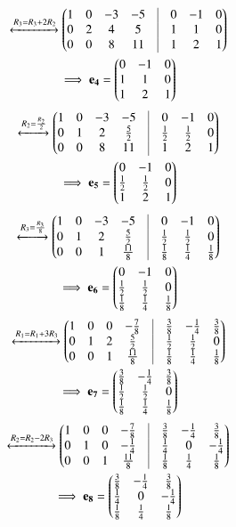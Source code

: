 \documentclass[journal,12pt,twocolumn]{IEEEtran}
\begin{document}
\begin{multline}
\xleftrightarrow{R_3=R_3+2R_2}\myvec{1&0&-3&-5&\vrule&0&-1&0\\0&2&4&5&\vrule&1&1&0\\0&0&8&11&\vrule&1&2&1}\\
\implies\vec{e_4}=\myvec{0&-1&0\\1&1&0\\1&2&1}
\end{multline}
\begin{multline}
\xleftrightarrow{R_2=\frac{R_2}{2}}\myvec{1&0&-3&-5&\vrule&0&-1&0\\0&1&2&\frac{5}{2}&\vrule&\frac{1}{2}&\frac{1}{2}&0\\0&0&8&11&\vrule&1&2&1}\\
\implies\vec{e_5}=\myvec{0&-1&0\\\frac{1}{2}&\frac{1}{2}&0\\1&2&1}
\end{multline}
\begin{multline}
\xleftrightarrow{R_3=\frac{R_3}{8}}\myvec{1&0&-3&-5&\vrule&0&-1&0\\0&1&2&\frac{5}{2}&\vrule&\frac{1}{2}&\frac{1}{2}&0\\0&0&1&\frac{11}{8}&\vrule&\frac{1}{8}&\frac{1}{4}&\frac{1}{8}}\\
\implies\vec{e_6}=\myvec{0&-1&0\\\frac{1}{2}&\frac{1}{2}&0\\\frac{1}{8}&\frac{1}{4}&\frac{1}{8}}
\end{multline}
\begin{multline}
\xleftrightarrow{R_1=R_1+3R_3}\myvec{1&0&0&-\frac{7}{8}&\vrule&\frac{3}{8}&-\frac{1}{4}&\frac{3}{8}\\0&1&2&\frac{5}{2}&\vrule&\frac{1}{2}&\frac{1}{2}&0\\0&0&1&\frac{11}{8}&\vrule&\frac{1}{8}&\frac{1}{4}&\frac{1}{8}}\\
\implies\vec{e_7}=\myvec{\frac{3}{8}&-\frac{1}{4}&\frac{3}{8}\\\frac{1}{2}&\frac{1}{2}&0\\\frac{1}{8}&\frac{1}{4}&\frac{1}{8}}
\end{multline}
\begin{multline}
\xleftrightarrow{R_2=R_2-2R_3}\myvec{1&0&0&-\frac{7}{8}&\vrule&\frac{3}{8}&-\frac{1}{4}&\frac{3}{8}\\0&1&0&-\frac{1}{4}&\vrule&\frac{1}{4}&0&-\frac{1}{4}\\0&0&1&\frac{11}{8}&\vrule&\frac{1}{8}&\frac{1}{4}&\frac{1}{8}}\\
\implies\vec{e_8}=\myvec{\frac{3}{8}&-\frac{1}{4}&\frac{3}{8}\\\frac{1}{4}&0&-\frac{1}{4}\\\frac{1}{8}&\frac{1}{4}&\frac{1}{8}}\label{1}
\end{multline}
\end{document}
